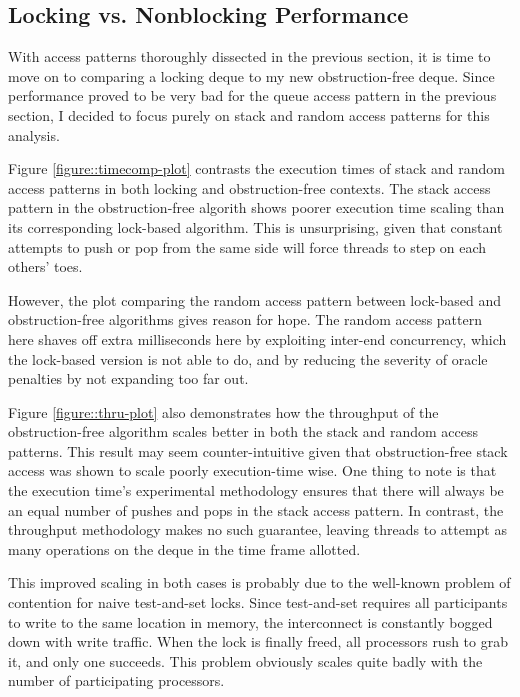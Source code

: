 \documentclass[11pt, letterpaper]{article}
\begin{document}
        \subsection{Locking vs. Nonblocking Performance}
            With access patterns thoroughly dissected in the previous section, it is time to move on to comparing a locking deque to my new obstruction-free deque. Since performance proved to be very bad for the queue access pattern in the previous section, I decided to focus purely on stack and random access patterns for this analysis.

            Figure \ref{figure::timecomp-plot} contrasts the execution times of stack and random access patterns in both locking and obstruction-free contexts. The stack access pattern in the obstruction-free algorith shows poorer execution time scaling than its corresponding lock-based algorithm. This is unsurprising, given that constant attempts to push or pop from the same side will force threads to step on each others' toes.

            However, the plot comparing the random access pattern between lock-based and obstruction-free algorithms gives reason for hope. The random access pattern here shaves off extra milliseconds here by exploiting inter-end concurrency, which the lock-based version is not able to do, and by reducing the severity of oracle penalties by not expanding too far out.

            Figure \ref{figure::thru-plot} also demonstrates how the throughput of the obstruction-free algorithm scales better in both the stack and random access patterns. This result may seem counter-intuitive given that obstruction-free stack access was shown to scale poorly execution-time wise. One thing to note is that the execution time's experimental methodology ensures that there will always be an equal number of pushes and pops in the stack access pattern. In contrast, the throughput methodology makes no such guarantee, leaving threads to attempt as many operations on the deque in the time frame allotted.

            This improved scaling in both cases is probably due to the well-known problem of contention for naive test-and-set locks. Since test-and-set requires all participants to write to the same location in memory, the interconnect is constantly bogged down with write traffic. When the lock is finally freed, all processors rush to grab it, and only one succeeds. This problem obviously scales quite badly with the number of participating processors.
\end{document}
